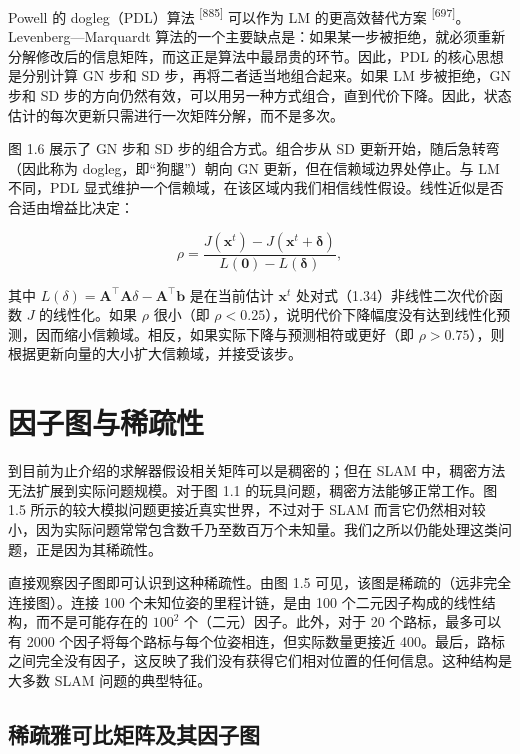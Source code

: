Powell 的 dogleg（PDL）算法 \textsuperscript{[885]} 可以作为 LM 的更高效替代方案 \textsuperscript{[697]}。Levenberg—Marquardt 算法的一个主要缺点是：如果某一步被拒绝，就必须重新分解修改后的信息矩阵，而这正是算法中最昂贵的环节。因此，PDL 的核心思想是分别计算 GN 步和 SD 步，再将二者适当地组合起来。如果 LM 步被拒绝，GN 步和 SD 步的方向仍然有效，可以用另一种方式组合，直到代价下降。因此，状态估计的每次更新只需进行一次矩阵分解，而不是多次。

图 1.6 展示了 GN 步和 SD 步的组合方式。组合步从 SD 更新开始，随后急转弯（因此称为 dogleg，即“狗腿”）朝向 GN 更新，但在信赖域边界处停止。与 LM 不同，PDL 显式维护一个信赖域，在该区域内我们相信线性假设。线性近似是否合适由增益比决定：

\begin{equation}
\rho = \frac {J (\boldsymbol {x} ^ {t}) - J (\boldsymbol {x} ^ {t} + \boldsymbol {\delta})}{L (\boldsymbol {0}) - L (\boldsymbol {\delta})},\tag{1.39}
\end{equation}

其中 $L(\delta)=\pmb A^\top\pmb A\delta-\pmb A^\top\pmb b$ 是在当前估计 $\pmb x^t$ 处对式（1.34）非线性二次代价函数 $J$ 的线性化。如果 $\rho$ 很小（即 $\rho<0.25$），说明代价下降幅度没有达到线性化预测，因而缩小信赖域。相反，如果实际下降与预测相符或更好（即 $\rho>0.75$），则根据更新向量的大小扩大信赖域，并接受该步。

\section{因子图与稀疏性}

到目前为止介绍的求解器假设相关矩阵可以是稠密的；但在 SLAM 中，稠密方法无法扩展到实际问题规模。对于图 1.1 的玩具问题，稠密方法能够正常工作。图 1.5 所示的较大模拟问题更接近真实世界，不过对于 SLAM 而言它仍然相对较小，因为实际问题常常包含数千乃至数百万个未知量。我们之所以仍能处理这类问题，正是因为其稀疏性。

直接观察因子图即可认识到这种稀疏性。由图 1.5 可见，该图是稀疏的（远非完全连接图）。连接 100 个未知位姿的里程计链，是由 100 个二元因子构成的线性结构，而不是可能存在的 $100^2$ 个（二元）因子。此外，对于 20 个路标，最多可以有 2000 个因子将每个路标与每个位姿相连，但实际数量更接近 400。最后，路标之间完全没有因子，这反映了我们没有获得它们相对位置的任何信息。这种结构是大多数 SLAM 问题的典型特征。

\subsection{稀疏雅可比矩阵及其因子图}


